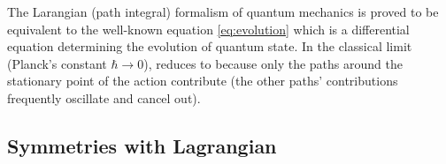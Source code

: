 The Larangian (path integral) formalism of quantum mechanics is proved to be equivalent to the well-known \schrodinger equation \cref{eq:evolution} \cite[Chp4]{feynmanQuantumMechanicsPath2010} 
which is a differential equation determining the evolution of quantum state.
In the classical limit (Planck's constant $\hbar\to 0$),  reduces to 
because only the paths around the stationary point of the action contribute 
(the other paths' contributions frequently oscillate and cancel out).

\subsection{Symmetries with Lagrangian}